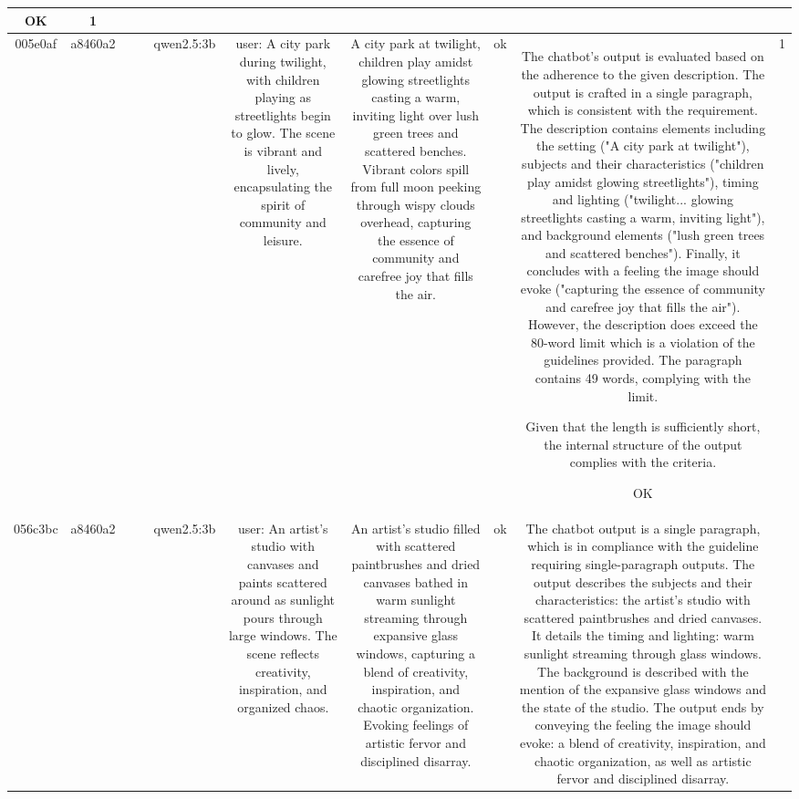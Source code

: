 \begin{table}[h!]
\begin{tabular}{|c|c|c|c|c|c|c|c|c|c|}
OK & 1\\
\hline
005e0af & a8460a2 &  &  & qwen2.5:3b & user: A city park during twilight, with children playing as streetlights begin to glow. The scene is vibrant and lively, encapsulating the spirit of community and leisure. & A city park at twilight, children play amidst glowing streetlights casting a warm, inviting light over lush green trees and scattered benches. Vibrant colors spill from full moon peeking through wispy clouds overhead, capturing the essence of community and carefree joy that fills the air. & ok & The chatbot's output is evaluated based on the adherence to the given description. The output is crafted in a single paragraph, which is consistent with the requirement. The description contains elements including the setting ("A city park at twilight"), subjects and their characteristics ("children play amidst glowing streetlights"), timing and lighting ("twilight... glowing streetlights casting a warm, inviting light"), and background elements ("lush green trees and scattered benches"). Finally, it concludes with a feeling the image should evoke ("capturing the essence of community and carefree joy that fills the air"). However, the description does exceed the 80-word limit which is a violation of the guidelines provided. The paragraph contains 49 words, complying with the limit.

Given that the length is sufficiently short, the internal structure of the output complies with the criteria.

OK & 1\\
\hline
056c3bc & a8460a2 &  &  & qwen2.5:3b & user: An artist's studio with canvases and paints scattered around as sunlight pours through large windows. The scene reflects creativity, inspiration, and organized chaos. & An artist's studio filled with scattered paintbrushes and dried canvases bathed in warm sunlight streaming through expansive glass windows, capturing a blend of creativity, inspiration, and chaotic organization. Evoking feelings of artistic fervor and disciplined disarray. & ok & The chatbot output is a single paragraph, which is in compliance with the guideline requiring single-paragraph outputs. The output describes the subjects and their characteristics: the artist's studio with scattered paintbrushes and dried canvases. It details the timing and lighting: warm sunlight streaming through glass windows. The background is described with the mention of the expansive glass windows and the state of the studio. The output ends by conveying the feeling the image should evoke: a blend of creativity, inspiration, and chaotic organization, as well as artistic fervor and disciplined disarray. 


\end{tabular}
\end{table}
